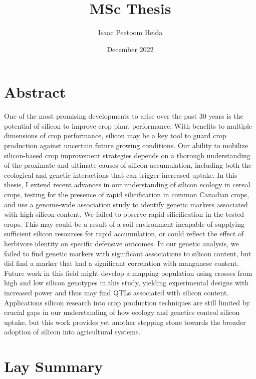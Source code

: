 \documentclass[12pt, letterpaper, ]{report}
\title{MSc Thesis}
\author{Isaac Peetoom Heida}
\date{December 2022}
\begin{document}


\tableofcontents
\newpage
\listoftables
\newpage
\listoffigures
\chapter*{Abstract}

One of the most promising developments to arise over the past 30 years is the potential of silicon to improve crop plant performance. With benefits to multiple dimensions of crop performance, silicon may be a key tool to guard crop production against uncertain future growing conditions. Our ability to mobilize silicon-based crop improvement strategies depends on a thorough understanding of the proximate and ultimate causes of silicon accumulation, including both the ecological and genetic interactions that can trigger increased uptake. In this thesis, I extend recent advances in our understanding of silicon ecology in cereal crops, testing for the presence of rapid silicification in common Canadian crops, and use a  genome-wide association study to identify genetic markers associated with high silicon content. We failed to observe rapid silicification in the tested crops. This may could be a result of a soil environment incapable of supplying sufficient silicon resources for rapid accumulation, or could reflect the effect of herbivore identity on specific defensive outcomes. In our genetic analysis, we failed to find genetic markers with significant associations to silicon content, but did find a marker that had a significant correlation with manganese content. Future work in this field might develop a mapping population using crosses from high and low silicon genotypes in this study, yielding experimental designs with increased power and thus may find QTLs associated with silicon content. Applications silicon research into crop production techniques are still limited by crucial gaps in our understanding of how ecology and genetics control silicon uptake, but this work provides yet another stepping stone towards the broader adoption of silicon into agricultural systems.

\chapter*{Lay Summary}
\end{document}
